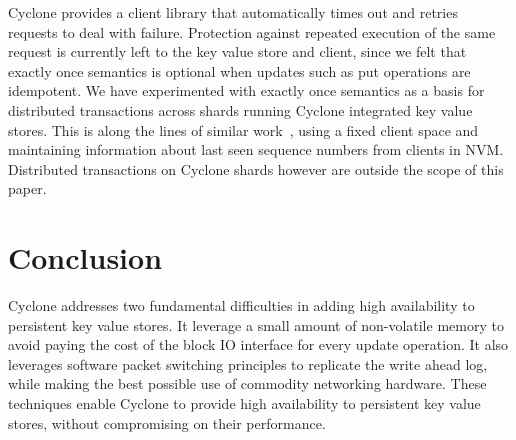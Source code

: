 \documentclass[pageno]{jpaper}
\begin{document}
Cyclone provides a client library that automatically times out and retries
requests to deal with failure. Protection against repeated execution of the same
request is currently left to the key value store and client, since we felt that
exactly once semantics is optional when updates such as put operations are
idempotent. We have experimented with exactly once semantics as a basis for
distributed transactions across shards running Cyclone integrated key value
stores. This is along the lines of similar work~\cite{raft_lin}, using a fixed
client space and maintaining information about last seen sequence numbers from
clients in NVM. Distributed transactions on Cyclone shards however are outside
the scope of this paper.

\section{Conclusion}
Cyclone addresses two fundamental difficulties in adding high availability to
persistent key value stores. It leverage a small amount of non-volatile memory
to avoid paying the cost of the block IO interface for every update
operation. It also leverages software packet switching principles to replicate
the write ahead log, while making the best possible use of commodity networking
hardware. These techniques enable Cyclone to provide high availability to
persistent key value stores, without compromising on their performance. 
\newcommand\myurl[2]{\url{#1}}


\end{document}
